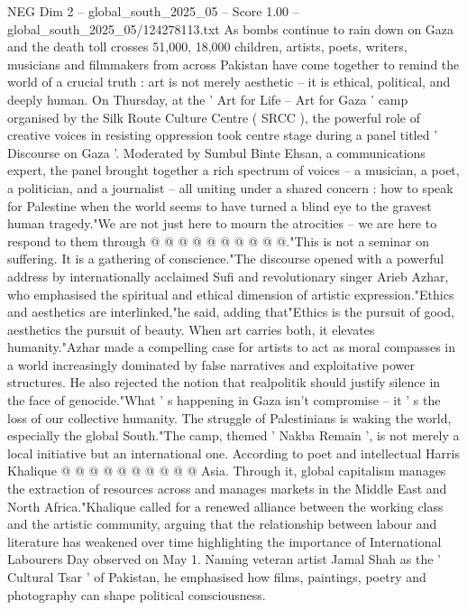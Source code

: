 \begin{textsample}{NEG Dim 2 – global\_south\_2025\_05 – Score 1.00 – global\_south\_2025\_05/124278113.txt}  \label{ex:f2_neg_146}
As bombs continue to rain down on Gaza and the death toll crosses 51,000, 18,000 children, artists, poets, writers, musicians and filmmakers from across Pakistan have come together to remind the world of a crucial truth : art is not merely aesthetic -- it is ethical, political, and deeply human.
On Thursday, at the ' Art for Life -- Art for Gaza ' camp organised by the Silk Route Culture Centre ( SRCC ), the powerful role of creative voices in resisting oppression took centre stage during a panel titled ' Discourse on Gaza '.
Moderated by Sumbul Binte Ehsan, a communications expert, the panel brought together a rich spectrum of voices -- a musician, a poet, a politician, and a journalist -- all uniting under a shared concern : how to speak for Palestine when the world seems to have turned a blind eye to the gravest human tragedy."We are not just here to mourn the atrocities -- we are here to respond to them through @ @ @ @ @ @ @ @ @ @."This is not a seminar on suffering.
It is a gathering of conscience."The discourse opened with a powerful address by internationally acclaimed Sufi and revolutionary singer Arieb Azhar, who emphasised the spiritual and ethical dimension of artistic expression."Ethics and aesthetics are interlinked,"he said, adding that"Ethics is the pursuit of good, aesthetics the pursuit of beauty.
When art carries both, it elevates humanity."Azhar made a compelling case for artists to act as moral compasses in a world increasingly dominated by false narratives and exploitative power structures.
He also rejected the notion that realpolitik should justify silence in the face of genocide."What ' s happening in Gaza isn't compromise -- it ' s the loss of our collective humanity.
The struggle of Palestinians is waking the world, especially the global South."The camp, themed ' Nakba Remain ', is not merely a local initiative but an international one.
According to poet and intellectual Harris Khalique @ @ @ @ @ @ @ @ @ @ Asia.
Through it, global capitalism manages the extraction of resources across and manages markets in the Middle East and North Africa."Khalique called for a renewed alliance between the working class and the artistic community, arguing that the relationship between labour and literature has weakened over time highlighting the importance of International Labourers Day observed on May 1.
Naming veteran artist Jamal Shah as the ' Cultural Tsar ' of Pakistan, he emphasised how films, paintings, poetry and photography can shape political consciousness.

\end{textsample}
